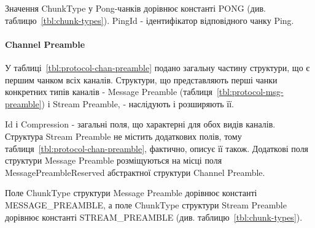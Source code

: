 \begin{table}[htbp]
\end{table}

Значення ChunkType у Pong-чанків дорівнює константі PONG (див.
таблицю~\ref{tbl:chunk-types}). PingId - ідентифікатор відповідного чанку
Ping.

\paragraph{Channel Preamble}

У таблиці~\ref{tbl:protocol-chan-preamble} подано загальну частину структури,
що є першим чанком всіх каналів. Структури, що представляють перші чанки
конкретних типів каналів - Message Preamble
(таблиця~\ref{tbl:protocol-msg-preamble}) і Stream Preamble, - наслідують і
розширяють її.

Id і Compression - загальні поля, що характерні для обох видів каналів.
Структура Stream Preamble не містить додаткових полів, тому
таблиця~\ref{tbl:protocol-chan-preamble}, фактично, описує її також.  Додаткові
поля структури Message Preamble розміщуються на місці поля
MessagePreambleReserved абстрактної структури Channel Preamble.

Поле ChunkType структури Message Preamble дорівнює константі MESSAGE\_PREAMBLE,
а поле ChunkType структури Stream Preamble дорівнює константі STREAM\_PREAMBLE
(див. таблицю~\ref{tbl:chunk-types}).

\begin{table}[htbp]
\end{table}

